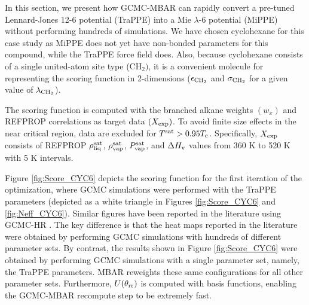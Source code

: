 \documentclass[journal=jced,manuscript=article]{achemso}
\begin{document}



In this section, we present how GCMC-MBAR can rapidly convert a pre-tuned Lennard-Jones 12-6 potential (TraPPE) into a Mie $\lambda$-6 potential (MiPPE) without performing hundreds of simulations. We have chosen cyclohexane for this case study as MiPPE does not yet have non-bonded parameters for this compound, while the TraPPE force field does. Also, because cyclohexane consists of a single united-atom site type (CH$_2)$, it is a convenient molecule for representing the scoring function in 2-dimensions ($\epsilon_{\rm CH_2}$ and $\sigma_{\rm CH_2}$ for a given value of $\lambda_{\rm CH_2}$). 

The scoring function is computed with the branched alkane weights $(w_{x})$ and REFPROP correlations\cite{LEMMON-RP10,Zhou2014} as target data $(X_{\rm exp})$. To avoid finite size effects in the near critical region, data are excluded for $T^{\rm sat} > 0.95 T_{\rm c}$. Specifically, $X_{\rm exp}$ consists of REFPROP $\rho_{\rm liq}^{\rm sat}$, $\rho_{\rm vap}^{\rm sat}$, $P_{\rm vap}^{\rm sat}$, and $\Delta H_{\rm v}$ values from 360 K to 520 K with 5 K intervals.

Figure \ref{fig:Score_CYC6} depicts the scoring function for the first iteration of the optimization, where GCMC simulations were performed with the TraPPE parameters (depicted as a white triangle in Figures \ref{fig:Score_CYC6} and \ref{fig:Neff_CYC6}). Similar figures have been reported in the literature using GCMC-HR \cite{Potoff_branched,Barhaghi2017}. The key difference is that the heat maps reported in the literature were obtained by performing GCMC simulations with hundreds of different parameter sets. By contrast, the results shown in Figure \ref{fig:Score_CYC6} were obtained by performing GCMC simulations with a single parameter set, namely, the TraPPE parameters. MBAR reweights these same configurations for all other parameter sets. Furthermore, $U(\theta_{\rm rr})$ is computed with basis functions, enabling the GCMC-MBAR recompute step to be extremely fast. 
\end{document}

